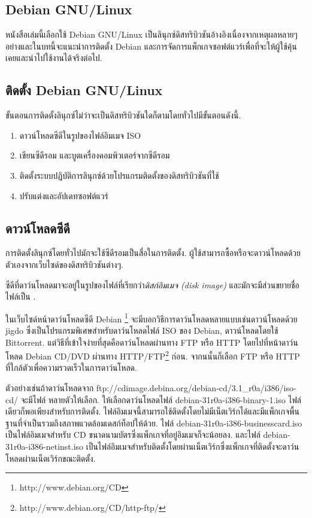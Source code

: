 \begin{thwbr}
\chapter{Debian GNU/Linux}\label{chap:debian}
หนังสือเล่มนี้เลือกใช้ Debian GNU/Linux เป็นลินุกซ์ดิสทริบิวชันอ้างอิงเนื่องจากเหตุผลหลายๆอย่างและในบทนี้จะแนะนำการติดตั้ง Debian และการจัดการแพ็กเกจซอฟต์แวร์เพื่อที่จะให้ผู้ใช้คุ้นเคยและนำไปใช้งานได้จริงต่อไป.

\section{ติดตั้ง Debian GNU/Linux}

ขั้นตอนการติดตั้งลินุกซ์ไม่ว่าจะเป็นดิสทริบิวชันใดก็ตามโดยทั่วไปมีขั้นตอนดังนี้.
\begin{enumerate}
\item ดาวน์โหลดซีดีในรูปของไฟล์อิมเมจ ISO
\item เขียนซีดีรอม และบูตเครื่องคอมพิวเตอร์จากซีดีรอม
\item ติดตั้งระบบปฏิบัติการลินุกซ์ด้วยโปรแกรมติดตั้งของดิสทริบิวชันที่ใช้
\item ปรับแต่งและอัปเดทซอฟต์แวร์
\end{enumerate}

\section{ดาวน์โหลดซีดี}
การติดตั้งลินุกซ์โดยทั่วไปมักจะใช้ซีดีรอมเป็นสื่อในการติดตั้ง. ผู้ใช้สามารถซื้อหรือจะดาวน์โหลดด้วยตัวเองจากเว็บไซด์ของดิสทริบิวชันต่างๆ.

ซีดีที่ดาว์นโหลดมาจะอยู่ในรูปของไฟล์ที่เรียกว่า\emph{ดิสก์อิมเมจ (disk image)} และมักจะมีส่วนขยายชื่อไฟล์เป็น . %
%

ในเว็บไซด์หน้าดาว์นโหลดซีดี Debian \footnote{http://www.debian.org/CD} จะมีบอกวิธีการดาว์นโหลดหลายแบบเช่นดาวน์โหลดด้วย jigdo ซึ่งเป็นโปรแกรมพิเศษสำหรับดาว์นโหลดไฟล์ ISO ของ Debian, ดาวน์โหลดโดยใช้ Bittorrent. แต่วิธีที่เข้าใจง่ายที่สุดคือดาว์นโหลดผ่านทาง FTP หรือ HTTP โดยไปที่หน้าดาว์นโหลด Debian CD/DVD ผ่านทาง HTTP/FTP\footnote{http://www.debian.org/CD/http-ftp/} ก่อน. จากนนั้นก็เลือก FTP หรือ HTTP ที่ใกล้ตัวเพื่อความรวดเร็วในการดาว์นโหลด. 

ตัวอย่างเช่นถ้าดาว์นโหลดจาก \mbox{ftp://cdimage.debina.org/debian-cd/3.1\_r0a/i386/iso-cd/} จะมีไฟล์  หลายตัวให้เลือก. ให้เลือกดาว์นโหลดไฟล์ debian-31r0a-i386-binary-1.iso ไฟล์เดียวก็พอเพียงสำหรับการติดตั้ง. ไฟล์อิมเมจนี้สามารถใช้ติดตั้งโดยไม่มีเน็ตเวิร์กได้และมีแพ็กเกจพื้นฐานที่จำเป็นรวมถึงสภาพแวดล้อมเดสก์ท็อปให้ด้วย. ไฟล์ debian-31r0a-i386-businesscard.iso เป็นไฟล์อิมเมจสำหรับ CD ขนาดนามบัตรซึ่งแพ็กเกจที่อยู่อิมเมจก็จะน้อยลง. และไฟล์ debian-31r0a-i386-netinst.iso เป็นไฟล์อิมเมจสำหรับติดตั้งโดยผ่านเน็ตเวิร์กซึ่งแพ็กเกจที่ติดตั้งจะดาว์นโหลดผ่านเน็ตเวิร์กขณะติดตั้ง.




\end{thwbr}

